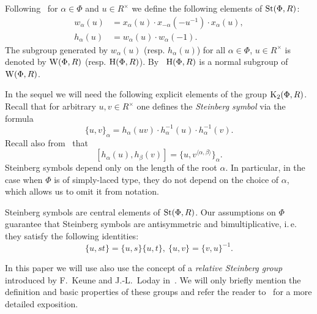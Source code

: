 Following~\cite{Ma69} for $\alpha\in\Phi$ and $u \in R^\times$ we define the following elements of $\operatorname{St}(\Phi, R)$:
\begin{align*} w_\alpha(u) & =  x_\alpha(u) \cdot x_{-\alpha}(-u^{-1}) \cdot x_\alpha(u), \\
               h_\alpha(u) & =  w_\alpha(u) \cdot w_\alpha(-1).  \end{align*}
The subgroup generated by $w_\alpha(u)$ (resp. $h_\alpha(u)$) for all $\alpha\in \Phi$, $u \in R^\times$ is denoted by $\operatorname{W}(\Phi, R)$ (resp. $\operatorname{H}(\Phi, R)$).
By~\cite[Lemme~5.2]{Ma69} $\operatorname{H}(\Phi, R)$ is a normal subgroup of $\operatorname{W}(\Phi, R)$.

In the sequel we will need the following explicit elements of the group $\operatorname{K}_2(\Phi, R)$.
Recall that for arbitrary $u, v \in R^\times$ one defines the \textit{Steinberg symbol} via the formula
\begin{equation} \label{eq:steinberg} \{ u, v \}_\alpha = h_\alpha(uv) \cdot h_\alpha^{-1}(u) \cdot h_\alpha^{-1}(v). \end{equation}
Recall also from~\cite[Lemme~5.4]{Ma69} that
\begin{equation} \label{eq:steinberg-2} [h_\alpha(u), h_\beta(v)] = \{u, v^{\langle \alpha, \beta \rangle}\}_\alpha. \end{equation}
Steinberg symbols depend only on the length of the root $\alpha$.
In particular, in the case when $\Phi$ is of simply-laced type, they do not depend on the choice of $\alpha$, which allows us to omit it from notation.

Steinberg symbols are central elements of $\operatorname{St}(\Phi, R)$.
Our assumptions on $\Phi$ guarantee that Steinberg symbols are antisymmetric and bimultiplicative, i.\,e. they satisfy the following identities:
\begin{equation} \label{eq:symbol-properties} \{ u, st \} = \{ u, s\} \{ u, t \}, \ \{ u, v \} = \{ v, u\}^{-1}. \end{equation}

In this paper we will use also use the concept of a \textit{relative Steinberg group} introduced by F.~Keune and J.-L.~Loday in~\cite{Ke78, Lo78}.
We will only briefly mention the definition and basic properties of these groups and refer the reader to~\cite[\S~2.3]{LS20} for a more detailed exposition.

